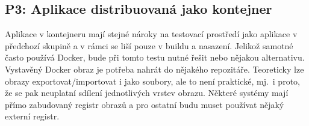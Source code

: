     \subsection{P3: Aplikace distribuovaná jako kontejner}
        Aplikace v kontejneru mají stejné nároky na testovací prostředí jako aplikace v předchozí skupině a v rámci \CICD se liší pouze v buildu a nasazení. Jelikož samotné \CI často používá Docker, bude při tomto testu nutné řešit  nebo nějakou alternativu. Vystavěný Docker obraz je potřeba nahrát do nějakého repozitáře. Teoreticky lze obrazy exportovat/importovat i jako soubory, ale to není praktické, mj.~i proto, že se pak neuplatní sdílení jednotlivých vrstev obrazu. Některé systémy mají přímo zabudovaný registr obrazů a pro ostatní budu muset používat nějaký externí registr.

